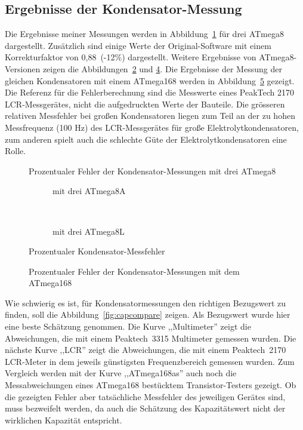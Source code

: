 \subsection{Ergebnisse der Kondensator-Messung}
Die Ergebnisse meiner Messungen werden in Abbildung~\ref{fig:mega8cap} für drei ATmega8 dargestellt.
Zusätzlich sind einige Werte der Original-Software mit einem Korrekturfaktor
von 0,88~(-12\%) dargestellt.
Weitere Ergebnisse von ATmega8-Versionen zeigen die Abbildungen~\ref{fig:mega8Acap} und \ref{fig:mega8Lcap}.
Die Ergebnisse der Messung der gleichen Kondensatoren mit einem ATmega168 werden in Abbildung~\ref{fig:mega168cap} gezeigt.
Die Referenz für die Fehlerberechnung sind die Messwerte eines PeakTech 2170 LCR-Messgerätes, 
 nicht die aufgedruckten Werte der Bauteile.
Die grösseren relativen Messfehler bei großen Kondensatoren liegen zum Teil an der zu hohen Messfrequenz (100 Hz) des
LCR-Messgerätes für große Elektrolytkondensatoren, zum anderen spielt auch die schlechte Güte der
Elektrolytkondensatoren eine Rolle.

\begin{figure}[H]
\centering

\caption{Prozentualer Fehler der Kondensator-Messungen mit drei ATmega8}
\label{fig:mega8cap}
\end{figure}

\begin{figure}[H]
  \begin{subfigure}[b]{9cm}
    \centering
    \resizebox{9cm}{!}{}
    \caption{mit drei ATmega8A}
    \label{fig:mega8Acap}
  \end{subfigure}
  ~
  \begin{subfigure}[b]{9cm}
    \centering
    \resizebox{9cm}{!}{}
    \caption{mit drei ATmega8L}
    \label{fig:mega8Lcap}
  \end{subfigure}
  \caption{Prozentualer Kondensator-Messfehler}
\end{figure}

\begin{figure}[H]
\centering

\caption{Prozentualer Fehler der Kondensator-Messungen mit dem ATmega168}
\label{fig:mega168cap}
\end{figure}

Wie schwierig es ist, für Kondensatormessungen den richtigen Bezugswert zu finden, soll die Abbildung~\ref{fig:capcompare} zeigen.
Als Bezugswert wurde hier eine beste Schätzung genommen. Die Kurve ,,Multimeter'' zeigt die Abweichungen, die mit einem
Peaktech~3315 Multimeter gemessen wurden.
Die nächste Kurve ,,LCR'' zeigt die Abweichungen, die mit einem Peaktech~2170 LCR-Meter in dem jeweils günstigsten Frequenzbereich gemessen wurden.
Zum Vergleich werden mit der Kurve ,,ATmega168as'' auch noch die Messabweichungen eines ATmega168 bestücktem Transistor-Testers gezeigt.
Ob die gezeigten Fehler aber tatsächliche Messfehler des jeweiligen Gerätes sind, muss bezweifelt werden, da auch die
Schätzung des Kapazitätswert nicht der wirklichen Kapazität entspricht.

